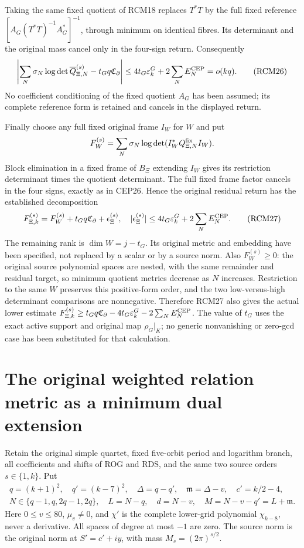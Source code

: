 \documentclass[11pt,a4paper]{article}
\begin{document}
Taking the same fixed quotient of RCM18 replaces $T^*T$
by the full fixed reference
$[A_G(T^*T)^{-1}A_G^*]^{-1}$, through minimum on identical
fibres. Its determinant and the original mass cancel only
in the four-sign return. Consequently
\[
 \left|\sum_N\sigma_N\log\det\overline Q_{\Xi,N}^{(s)}
                  -t_Gq\mathfrak C_\partial\right|
      \le4t_G\varepsilon_k^G+2\sum_NE_N^{\rm CEP}=o(kq).
 \tag{RCM26}
\]
No coefficient conditioning of the fixed quotient $A_G$ has
been assumed; its complete reference form is retained and
cancels in the displayed return.

Finally choose any full fixed original frame $I_W$ for $W$
and put
\[
 F_W^{(s)}=\sum_N\sigma_N\log\det(I_W^*Q_{\Xi,N}^{\rm fix}I_W).
\]
Block elimination in a fixed frame of $B_{\Xi}$ extending
$I_W$ gives its restriction determinant times the quotient
determinant. The full fixed frame factor cancels in the
four signs, exactly as in CEP26. Hence the original residual
return has the established decomposition
\[
 F_{\Xi,k}^{(s)}=F_W^{(s)}+t_Gq\mathfrak C_\partial+\epsilon_\Xi^{(s)},
 \quad
 |\epsilon_\Xi^{(s)}|\le4t_G\varepsilon_k^G+2\sum_NE_N^{\rm CEP}.
 \tag{RCM27}
\]
The remaining rank is $\dim W=j-t_G$. Its original metric
and embedding have been specified, not replaced by a scalar
or by a source norm. Also $F_W^{(s)}\ge0$: the original
source polynomial spaces are nested, with the same remainder
and residual target, so minimum quotient metrics decrease
as $N$ increases. Restriction to the same $W$ preserves this
positive-form order, and the two low-versus-high determinant
comparisons are nonnegative. Therefore RCM27 also gives the
actual lower estimate
$F_{\Xi,k}^{(s)}\ge t_Gq\mathfrak C_\partial
 -4t_G\varepsilon_k^G-2\sum_NE_N^{\rm CEP}$.
The value of $t_G$ uses the exact active support and original
map $\rho_G|_K$; no generic nonvanishing or zero-gcd case has
been substituted for that calculation.


\clearpage
\section{The original weighted relation metric as a minimum dual extension}
\label{sec:DNE}

Retain the original simple quartet, fixed five-orbit period and
logarithm branch, all coefficients and shifts of ROG and RDS, and
the same two source orders $s\in\{1,k\}$. Put
\[
 \begin{gathered}
 q=(k+1)^2,\quad q'=(k-7)^2,\quad
 \Delta=q-q',\quad \mathfrak m=\Delta-v,\quad c'=k/2-4,\\
 N\in\{q-1,q,2q-1,2q\},\quad L=N-q,\quad
 d=N-v,\quad M=N-v-q'=L+\mathfrak m .
 \end{gathered}\tag{DNE1}
\]
Here $0\le v\le80$, $\mu_v\ne0$, and $\chi'$ is the complete
lower-grid polynomial $\chi_{k-8}$, never a derivative.
All spaces of degree at most $-1$ are zero. The source norm is
the original norm at $S'=c'+iy$, with mass $M_s=(2\pi)^{s/2}$.
\end{document}
